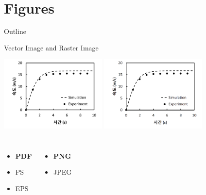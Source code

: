 \documentclass[12pt]{gshs_lecture}
\begin{document}
\section{Figures} %

\begin{frame}[t]{Outline}
\tableofcontents[currentsection]
\end{frame}

\begin{frame}[t]{Vector Image and Raster Image}\small
\begin{center}
\includegraphics[width=0.4\textwidth]{./figures/vector_image.pdf}\hspace{2em}
\includegraphics[width=0.4\textwidth]{./figures/raster_image.png}
\end{center}
\begin{columns}[T]
\begin{itemize}
\item \textbf{PDF}
\item PS
\item EPS
\end{itemize}
\begin{itemize}
\item \textbf{PNG}
\item JPEG
\end{itemize}
\end{columns}
\end{frame}
\end{document}
